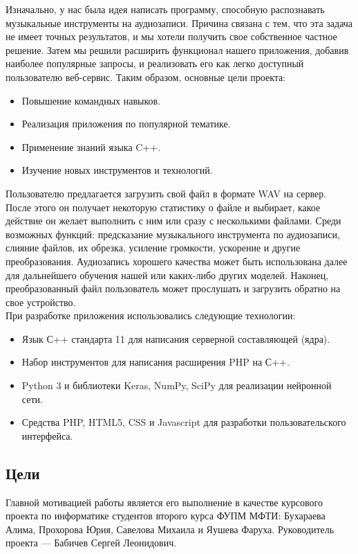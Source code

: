 \documentclass[14pt,a4paper]{article}
\begin{document}
Изначально, у нас была идея написать программу, способную распознавать музыкальные инструменты на аудиозаписи. Причина связана с тем, что эта задача не имеет точных результатов, и мы хотели получить свое собственное частное решение. Затем мы решили расширить функционал нашего приложения, добавив наиболее популярные запросы, и реализовать его как легко доступный пользователю веб-сервис. Таким образом, основные цели проекта:
\begin{itemize}
\item Повышение командных навыков.
\item Реализация приложения по популярной тематике.
\item Применение знаний языка C++.
\item Изучение новых инструментов и технологий.
\end{itemize}

Пользователю предлагается загрузить свой файл в формате WAV на сервер. После этого он получает некоторую статистику о файле и выбирает, какое действие он желает выполнить с ним или сразу с несколькими файлами. Среди возможных функций: предсказание музыкального инструмента по аудиозаписи, слияние файлов, их обрезка, усиление громкости, ускорение и другие преобразования. Аудиозапись хорошего качества может быть использована далее для дальнейшего обучения нашей или каких-либо других моделей. Наконец, преобразованный файл пользователь может прослушать и загрузить обратно на свое устройство.\\

При разработке приложения использовались следующие технологии:
\begin{itemize}
\item Язык С++ стандарта 11 для написания серверной составляющей (ядра).
\item Набор инструментов для написания расширения PHP на С++.
\item Python 3 и библиотеки Keras, NumPy, SciPy для реализации нейронной сети.
\item Средства PHP, HTML5, CSS и Javascript для разработки пользовательского интерфейса.
\end{itemize}

\subsection{Цели}

Главной мотивацией работы является его выполнение в качестве курсового проекта по информатике студентов второго курса ФУПМ МФТИ: Бухараева Алима, Прохорова Юрия, Савелова Михаила и Яушева Фаруха. Руководитель проекта --- Бабичев Сергей Леонидович. \\
\end{document}
